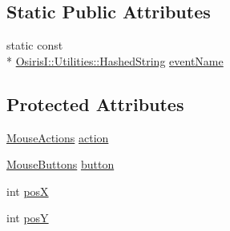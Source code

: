 \subsection*{Static Public Attributes}
\begin{DoxyCompactItemize}
\item 
static const \\*
\hyperlink{class_osiris_i_1_1_utilities_1_1_hashed_string}{Osiris\-I\-::\-Utilities\-::\-Hashed\-String} \hyperlink{struct_osiris_i_1_1_events_1_1_osiris_i___mouse_input_event_a709596bcb59650db41e9d7549a9dbd3a}{event\-Name}
\end{DoxyCompactItemize}
\subsection*{Protected Attributes}
\begin{DoxyCompactItemize}
\item 
\hyperlink{namespace_osiris_i_1_1_events_acfad4999b4155d29322b52fa50c40d08}{Mouse\-Actions} \hyperlink{struct_osiris_i_1_1_events_1_1_osiris_i___mouse_input_event_a76685c868136effe69d1017f313125f3}{action}
\item 
\hyperlink{namespace_osiris_i_1_1_events_aea8719a5bb7bb7a2296aa7469d9163e1}{Mouse\-Buttons} \hyperlink{struct_osiris_i_1_1_events_1_1_osiris_i___mouse_input_event_a04d6abe02f44e7fd0fcf8802dd5f0e4a}{button}
\item 
int \hyperlink{struct_osiris_i_1_1_events_1_1_osiris_i___mouse_input_event_a6bb12656332b418e6dc01faec54b20f5}{pos\-X}
\item 
int \hyperlink{struct_osiris_i_1_1_events_1_1_osiris_i___mouse_input_event_accc04535d428763c593b2abcd34bebdd}{pos\-Y}
\end{DoxyCompactItemize}


